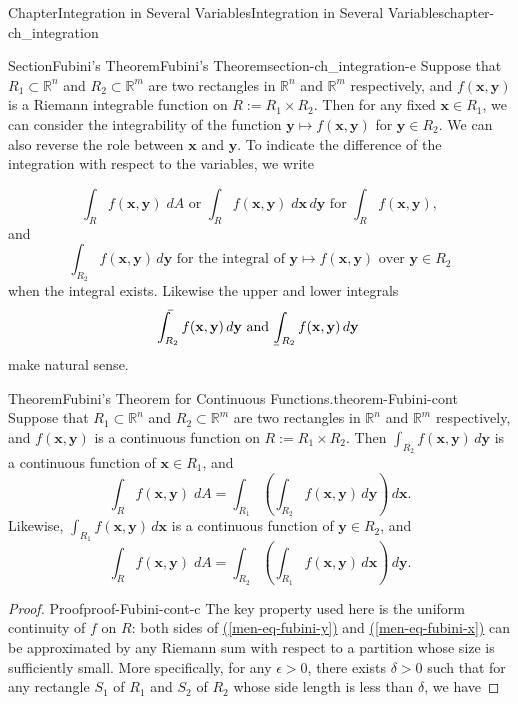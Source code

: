\documentclass[oneside,10pt,]{book}
\makeatletter
\newcommand{\xreffont}{\relax}
\numberwithin{equation}{section}
\newcommand{\bx}{\mathbf{x}}
\newcommand{\by}{\mathbf{y}}
\newcommand{\bbR}{\mathbb{R}}
\def\upint{\mathchoice
    {\mkern10mu\overline{\vphantom{\intop}\mkern7mu}\mkern-24mu}
    {\mkern7mu\overline{\vphantom{\intop}\mkern7mu}\mkern-14mu}
    {\mkern7mu\overline{\vphantom{\intop}\mkern7mu}\mkern-14mu}
    {\mkern7mu\overline{\vphantom{\intop}\mkern7mu}\mkern-14mu}
  \int}
\def\lowint{\relax\if@display
 \mkern3mu\underline{\vphantom{\intop}\mkern7mu}\mkern-10mu\int
\else 
\underline{\vphantom{\int}\mkern7mu}\mkern-10mu\int
\fi}
\makeatother
\begin{document}
\begin{chapterptx}{Chapter}{Integration in Several Variables}{}{Integration in Several Variables}{}{}{chapter-ch_integration}
\begin{sectionptx}{Section}{Fubini's Theorem}{}{Fubini's Theorem}{}{}{section-ch_integration-e}
Suppose that \(R_{1}\subset \bbR^{n}\) and \(R_{2}\subset \bbR^{m}\) are two rectangles in \(\bbR^{n}\) and \(\bbR^{m}\) respectively, and \(f(\bx, \by)\) is a Riemann integrable function on \(R:=R_{1}\times R_{2}\). Then for any fixed \(\bx\in R_{1}\), we can consider the integrability of the function \(\by\mapsto f(\bx, \by)\) for \(\by \in R_{2}\). We can also reverse the role between \(\bx\) and \(\by\).  To indicate the difference of the integration with respect to the variables, we write%
\par
%
\begin{equation*}
\int_{R} f(\bx, \by)\; dA \text{ or }  \int_{R} f(\bx, \by)\; d\bx\, d\by \text{ for } \int_{R} f(\bx, \by),
\end{equation*}
and%
\begin{equation*}
\int_{R_{2}}f(\bx, \by)\, d\by \text{ for the integral of $\by\mapsto f(\bx, \by)$ over $\by \in R_{2}$}
\end{equation*}
when the integral exists. Likewise the upper and lower integrals%
\begin{equation*}
\upint_{R_{2}}f(\bx, \by)\, d\by \text{ and } \lowint_{R_{2}}f(\bx, \by)\, d\by
\end{equation*}
make natural sense.%
\begin{theorem}{Theorem}{Fubini's Theorem for Continuous Functions.}{}{theorem-Fubini-cont}%
Suppose that \(R_{1}\subset \bbR^{n}\) and \(R_{2}\subset \bbR^{m}\) are two rectangles in \(\bbR^{n}\) and \(\bbR^{m}\) respectively, and \(f(\bx, \by)\) is a continuous function on \(R:=R_{1}\times R_{2}\).  Then \(\int_{R_{2}} f(\bx, \by)\, d\by\) is a continuous function of \(\bx \in R_{1}\), and%
\begin{equation}
\int_{R} f(\bx, \by)\; dA = \int_{R_{1}} \left( \int_{R_{2}} f(\bx, \by)\, d\by \right)\, d\bx.\label{men-eq-fubini-y}
\end{equation}
Likewise, \(\int_{R_{1}} f(\bx, \by)\, d\bx\) is a continuous function of \(\by \in R_{2}\), and%
\begin{equation}
\int_{R} f(\bx, \by)\; dA = \int_{R_{2}} \left( \int_{R_{1}} f(\bx, \by)\, d\bx \right)\, d\by.\label{men-eq-fubini-x}
\end{equation}
\end{theorem}
\begin{proof}{Proof}{}{proof-Fubini-cont-c}
The key property used here is the uniform continuity of \(f\) on \(R\): both sides of \hyperref[men-eq-fubini-y]{({\xreffont\ref{men-eq-fubini-y}})} and \hyperref[men-eq-fubini-x]{({\xreffont\ref{men-eq-fubini-x}})} can be approximated by any Riemann sum with respect to a partition whose size is sufficiently small. More specifically, for any \(\epsilon >0\), there exists \(\delta >0\) such that for any rectangle \(S_{1}\) of \(R_{1}\) and \(S_{2}\) of \(R_{2}\) whose side length is less than \(\delta\), we have%

\end{proof}
\end{sectionptx}
\end{chapterptx}
\end{document}

